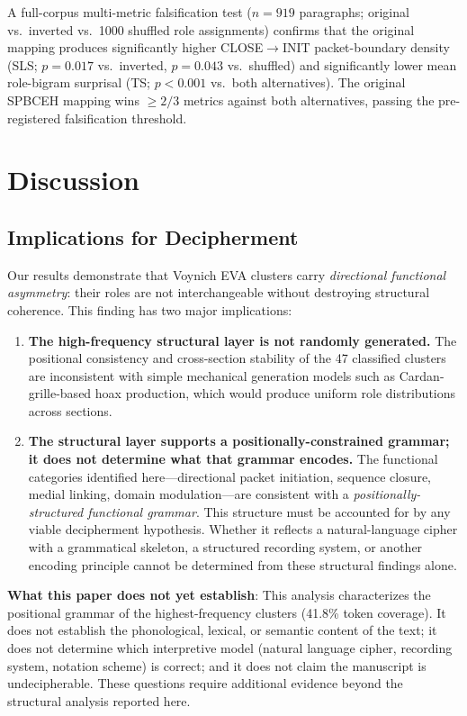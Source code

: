 \documentclass[11pt,a4paper,twocolumn]{article}
\begin{document}
A full-corpus multi-metric falsification test ($n=919$ paragraphs; original vs.\ inverted vs.\ 1000 shuffled role assignments) confirms that the original mapping produces significantly higher CLOSE$\to$INIT packet-boundary density (SLS; $p=0.017$ vs.\ inverted, $p=0.043$ vs.\ shuffled) and significantly lower mean role-bigram surprisal (TS; $p < 0.001$ vs.\ both alternatives). The original SPBCEH mapping wins $\geq 2/3$ metrics against both alternatives, passing the pre-registered falsification threshold.

\section{Discussion}
\label{sec:discussion}

\subsection{Implications for Decipherment}

Our results demonstrate that Voynich EVA clusters carry \textit{directional functional asymmetry}: their roles are not interchangeable without destroying structural coherence. This finding has two major implications:

\begin{enumerate}[leftmargin=*,itemsep=2pt]
    \item \textbf{The high-frequency structural layer is not randomly generated.} The positional consistency and cross-section stability of the 47 classified clusters are inconsistent with simple mechanical generation models such as Cardan-grille-based hoax production, which would produce uniform role distributions across sections.
    \item \textbf{The structural layer supports a positionally-constrained grammar; it does not determine what that grammar encodes.} The functional categories identified here---directional packet initiation, sequence closure, medial linking, domain modulation---are consistent with a \textit{positionally-structured functional grammar}. This structure must be accounted for by any viable decipherment hypothesis. Whether it reflects a natural-language cipher with a grammatical skeleton, a structured recording system, or another encoding principle cannot be determined from these structural findings alone.
\end{enumerate}

\noindent\textbf{What this paper does not yet establish}: This analysis characterizes the positional grammar of the highest-frequency clusters (41.8\% token coverage). It does not establish the phonological, lexical, or semantic content of the text; it does not determine which interpretive model (natural language cipher, recording system, notation scheme) is correct; and it does not claim the manuscript is undecipherable. These questions require additional evidence beyond the structural analysis reported here.
\end{document}
